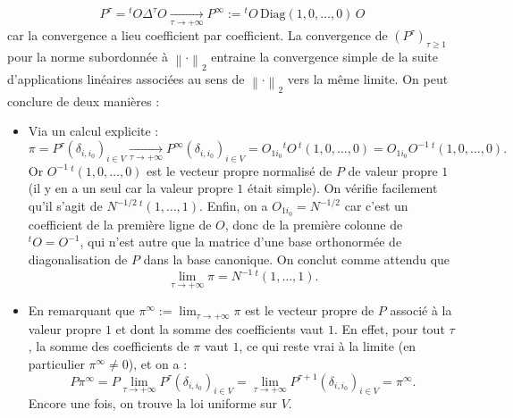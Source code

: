 \documentclass[11pt]{article}
\newcommand{\norm}[1]{\left\lVert #1 \right\rVert}
\renewcommand{\geq}{\geqslant}
\begin{document}
\begin{description}
    \begin{equation*}\label{eq:limite_P}
    P^{\tau} = {}^{t}O\Delta^{\tau}O \xrightarrow[\tau \to +\infty]{} P^{\infty} := {}^{t}O \,\mathrm{Diag}(1,0, \ldots, 0)\,O
    \end{equation*}
    car la convergence a lieu coefficient par coefficient. La convergence de $(P^{\tau})_{\tau \geq 1}$ pour la norme subordonnée à $\norm{\cdot}_2$ entraine la convergence simple de la suite d'applications linéaires associées au sens de $\norm{\cdot}_2$ vers la même limite.
    On peut conclure de deux manières :
    \begin{itemize}
        \item Via un calcul explicite :
        \begin{equation*}
        \pi = P^{\tau}(\delta_{i,i_0})_{i \in V} \xrightarrow[\tau \to +\infty]{} P^{\infty}(\delta_{i,i_0})_{i \in V} = O_{1i_0} {}^{t}O \,^{t}(1, 0, \ldots, 0) = O_{1i_0} O^{-1} \,^{t}(1, 0, \ldots, 0).
        \end{equation*}
        Or $O^{-1} \,^{t}(1, 0, \ldots, 0)$ est le vecteur propre normalisé de $P$ de valeur propre $1$ (il y en a un seul car la valeur propre $1$ était simple). On vérifie facilement qu'il s'agit de $N^{-1/2} \,{}^{t}(1, \ldots, 1)$. Enfin, on a $O_{1i_0} = N^{-1/2}$ car c'est un coefficient de la première ligne de $O$, donc de la première colonne de $^{t}O = O^{-1}$, qui n'est autre que la matrice d'une base orthonormée de diagonalisation de $P$ dans la base canonique. On conclut comme attendu que 
        \begin{equation}\label{eq:pi_infini}
        \lim_{\tau \to +\infty} \pi = N^{-1}\,^{t}(1, \ldots, 1).
        \end{equation}
        \item En remarquant que $\pi^{\infty} := \displaystyle\lim_{\tau \to +\infty}\pi$ est le vecteur propre de $P$ associé à la valeur propre $1$ et dont la somme des coefficients vaut $1$. En effet, pour tout $\tau$, la somme des coefficients de $\pi$ vaut $1$, ce qui reste vrai à la limite (en particulier $\pi^{\infty} \neq 0$), et on a :
        $$P \pi^{\infty} = P\lim_{\tau \to +\infty} P^{\tau}(\delta_{i,i_0})_{i \in V} = \lim_{\tau \to +\infty} P^{\tau + 1}(\delta_{i,i_0})_{i \in V} = \pi^{\infty}.$$
        Encore une fois, on trouve la loi uniforme sur $V$.
    \end{itemize} 
    
    


\end{description}
\end{document}
